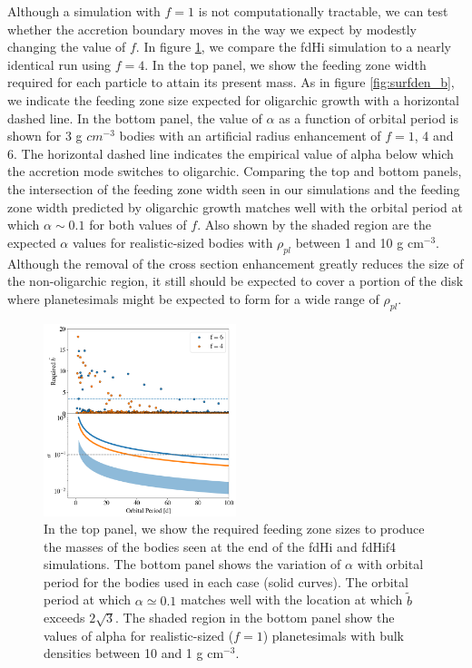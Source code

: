 \documentclass[twocolumn,linenumbers]{aastex63}
\begin{document}
Although a simulation with $f=1$ is not computationally tractable, we
can test whether the accretion boundary moves in the way we expect by
modestly changing the value of $f$. In figure \ref{fig:f6f4_b}, we
compare the fdHi simulation to a nearly identical run using $f=4$. In
the top panel, we show the feeding zone width required for each particle to
attain its present mass. As in figure \ref{fig:surfden_b}, we indicate the feeding
zone size expected for oligarchic growth with a horizontal dashed line. In the bottom panel, the value
of $\alpha$ as a function of orbital period is shown for 3 g $cm^{-3}$
bodies with an artificial radius enhancement of $f=1$, 4 and 6. The
horizontal dashed line indicates the empirical value of alpha below which the
accretion mode switches to oligarchic. Comparing the top and
bottom panels, the intersection of the feeding zone width seen in our simulations and the
feeding zone width predicted by oligarchic growth matches well with the orbital period at which $\alpha
\sim 0.1$ for both values of $f$.  Also shown by the shaded region are the expected $\alpha$ values for
realistic-sized bodies with $\rho_{pl}$ between 1 and 10 g cm$^{-3}$. Although the removal of the cross section
enhancement greatly reduces the size of the non-oligarchic region, it still should be expected to cover a portion of the
disk where planetesimals might be expected to form for a wide range of $\rho_{pl}$.

\begin{figure}
\begin{center}
    \includegraphics[width=0.5\textwidth]{figures/f6f4_b.png}
    \caption{In the top panel, we show the required feeding zone sizes to produce the masses of the bodies seen
    at the end of the fdHi and fdHif4 simulations.  The bottom panel shows the variation of $\alpha$ with orbital period for the 
    bodies used in each case (solid curves). The orbital period at which $\alpha \simeq 0.1$ matches well with the location at 
    which $\tilde{b}$ exceeds $2 \sqrt{3}$. The shaded region
    in the bottom panel show the values of alpha for realistic-sized ($f=1$) planetesimals with bulk densities between 10 and 1 g cm$^{-3}$.\label{fig:f6f4_b}}
\end{center}
\end{figure}
\end{document}
